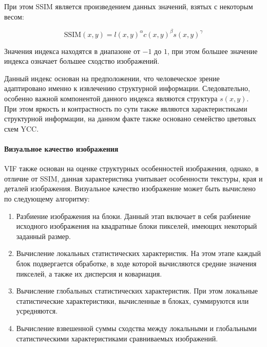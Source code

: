 При этом SSIM является произведением данных значений, взятых с некоторым весом:

\begin{equation} \label{eq:ssim_per_component}
    \text{SSIM}\left(x, y\right) = l\left(x, y\right)^{\alpha}
        c\left(x, y\right)^{\beta}
        s\left(x, y\right)^{\gamma}
\end{equation}

Значения индекса находятся в диапазоне от $-1$ до $1$, при этом большее значение
индекса означает большее сходство изображений.

Данный индекс основан на предположении, что человеческое зрение адаптировано
именно к извлечению структурной информации\cite{SSIMArticle}. Следовательно,
особенно важной компонентой данного индекса являются структура $s\left(x,
y\right)$. При этом яркость и контрастность по сути также являются
характеристиками структурной информации, на данном факте также основано
семейство цветовых схем YCC.

\paragraph{Визуальное качество изображения}

VIF также основан на оценке структурных особенностей изображения, однако, в
отличие от SSIM, данная характеристика учитывает особенности текстуры, края и
деталей изображения\cite{VIF}. Визуальное качество изображение может быть
вычислено по следующему алгоритму:

\begin{enumerate}
    \item Разбиение изображения на блоки. Данный этап включает в себя разбиение
    исходного изображения на квадратные блоки пикселей, имеющих некоторый
    заданный размер.
    \item Вычисление локальных статистических характеристик. На этом этапе
    каждый блок подвергается обработке, в ходе которой вычисляются средние
    значения пикселей, а также их дисперсия и ковариация.
    \item Вычисление глобальных статистических характеристик. При этом локальные
    статистические характеристики, вычисленные в блоках, суммируются или
    усредняются.
    \item Вычисление взвешенной суммы сходства между локальными и глобальными
    статистическими характеристиками сравниваемых изображений.
\end{enumerate}

